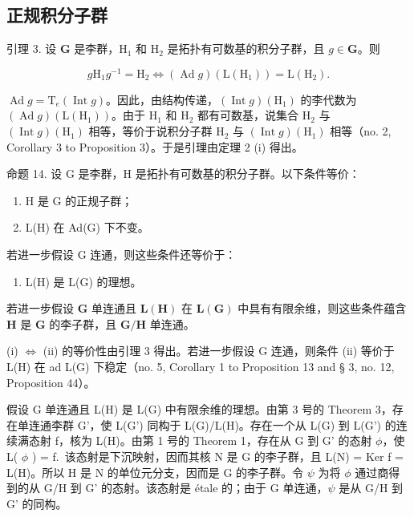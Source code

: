 \subsection{正规积分子群}

引理 3. 设 \(\mathbf{G}\) 是李群，\(\mathrm{H}_1\) 和 \(\mathrm{H}_2\) 是拓扑有可数基的积分子群，且 \(g \in \mathbf{G}\)。则

\[
g \mathrm{H} _ {1} g ^ {- 1} = \mathrm{H} _ {2} \Leftrightarrow (\operatorname{Ad} g) (\mathrm{L} (\mathrm{H} _ {1})) = \mathrm{L} (\mathrm{H} _ {2}).
\]

\(\operatorname{Ad} g = \mathrm{T}_{e}(\operatorname{Int} g)\)。因此，由结构传递，\((\operatorname{Int} g)(\mathrm{H}_{1})\) 的李代数为 \((\operatorname{Ad} g)(\mathrm{L}(\mathrm{H}_{1}))\)。由于 \(\mathrm{H}_{1}\) 和 \(\mathrm{H}_{2}\) 都有可数基，说集合 \(\mathrm{H}_{2}\) 与 \((\operatorname{Int} g)(\mathrm{H}_{1})\) 相等，等价于说积分子群 \(\mathrm{H}_{2}\) 与 \((\operatorname{Int} g)(\mathrm{H}_{1})\) 相等（no. 2, Corollary 3 to Proposition 3）。于是引理由定理 2 (i) 得出。

命题 14. 设 G 是李群，H 是拓扑有可数基的积分子群。以下条件等价：

\begin{enumerate}
\def\labelenumi{(\roman{enumi})}
\item
  H 是 G 的正规子群；
\item
  L(H) 在 Ad(G) 下不变。
\end{enumerate}

若进一步假设 G 连通，则这些条件还等价于：

\begin{enumerate}
\def\labelenumi{(\roman{enumi})}
\setcounter{enumi}{2}
\tightlist
\item
  L(H) 是 L(G) 的理想。
\end{enumerate}

若进一步假设 \(\mathbf{G}\) 单连通且 \(\mathbf{L}(\mathbf{H})\) 在 \(\mathbf{L}(\mathbf{G})\) 中具有有限余维，则这些条件蕴含 \(\mathbf{H}\) 是 \(\mathbf{G}\) 的李子群，且 \(\mathbf{G} / \mathbf{H}\) 单连通。

(i) \(\Leftrightarrow\) (ii) 的等价性由引理 3 得出。若进一步假设 G 连通，则条件 (ii) 等价于 L(H) 在 ad L(G) 下稳定（no. 5, Corollary 1 to Proposition 13 and § 3, no. 12, Proposition 44）。

假设 G 单连通且 L(H) 是 L(G) 中有限余维的理想。由第 3 号的 Theorem 3，存在单连通李群 G'，使 L(G') 同构于 L(G)/L(H)。存在一个从 L(G) 到 L(G') 的连续满态射 f，核为 L(H)。由第 1 号的 Theorem 1，存在从 G 到 G' 的态射 \(\phi\)，使 L( \(\phi\) ) = f.~该态射是下沉映射，因而其核 N 是 G 的李子群，且 L(N) = Ker f = L(H)。所以 H 是 N 的单位元分支，因而是 G 的李子群。令 \(\psi\) 为将 \(\phi\) 通过商得到的从 G/H 到 G' 的态射。该态射是 étale 的；由于 G 单连通，\(\psi\) 是从 G/H 到 G' 的同构。

